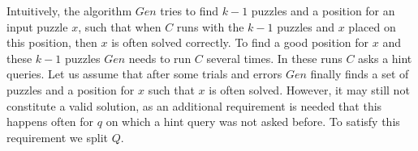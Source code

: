 %
%
Intuitively, the algorithm $Gen$ tries to find $k-1$ puzzles and a position for an input puzzle $x$, such that
when $C$ runs with the $k-1$ puzzles and $x$ placed on this position, then $x$ is often solved correctly.
To find a good position for $x$ and these $k-1$ puzzles $Gen$ needs to run $C$ several times.
In these runs $C$ asks a hint queries.
Let us assume that after some trials and errors $Gen$ finally finds a set of puzzles and a position for $x$ such that $x$ is often solved.
However, it may still not constitute a valid solution, as an additional requirement is needed that this happens often for $q$
on which a hint query was not asked before. To satisfy this requirement we split $Q$.
